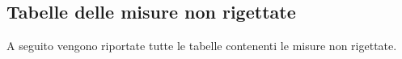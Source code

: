 \subsection{Tabelle delle misure non rigettate}
A seguito vengono riportate tutte le tabelle contenenti le misure non rigettate.
    
    
    
